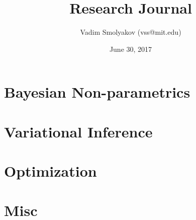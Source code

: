 \documentclass[11pt,a4paper]{article}
\begin{document}
\title{Research Journal}
\date{June 30, 2017}
\author{Vadim Smolyakov (vss@mit.edu)}
\maketitle

%

%

\section{Bayesian Non-parametrics}


\section{Variational Inference}


\section{Optimization}


\section{Misc}


%



\end{document}
